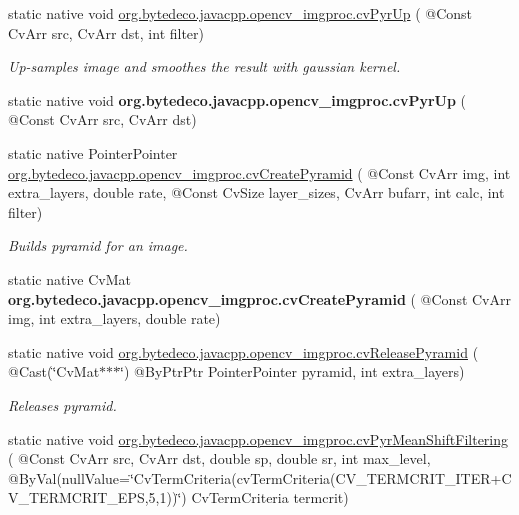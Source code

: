 \begin{DoxyCompactItemize}
\item 
static native void \hyperlink{group__imgproc__c_ga08b1a7b3bf0f0c133345b307e6dfa952}{org.\+bytedeco.\+javacpp.\+opencv\+\_\+imgproc.\+cv\+Pyr\+Up} ( @Const Cv\+Arr src, Cv\+Arr dst, int filter)
\begin{DoxyCompactList}\small\item\em Up-\/samples image and smoothes the result with gaussian kernel. \end{DoxyCompactList}\item 
\mbox{\label{group__imgproc__c_ga3121f9b420355a5fe0c4583d77e2f68d}} 
static native void {\bfseries org.\+bytedeco.\+javacpp.\+opencv\+\_\+imgproc.\+cv\+Pyr\+Up} ( @Const Cv\+Arr src, Cv\+Arr dst)
\item 
static native Pointer\+Pointer \hyperlink{group__imgproc__c_gad819c70ae44efaea82dfbf9745633179}{org.\+bytedeco.\+javacpp.\+opencv\+\_\+imgproc.\+cv\+Create\+Pyramid} ( @Const Cv\+Arr img, int extra\+\_\+layers, double rate, @Const Cv\+Size layer\+\_\+sizes, Cv\+Arr bufarr, int calc, int filter)
\begin{DoxyCompactList}\small\item\em Builds pyramid for an image. \end{DoxyCompactList}\item 
\mbox{\label{group__imgproc__c_gaa7de42cd41da20f87f5a3cf4fc0fc10a}} 
static native Cv\+Mat {\bfseries org.\+bytedeco.\+javacpp.\+opencv\+\_\+imgproc.\+cv\+Create\+Pyramid} ( @Const Cv\+Arr img, int extra\+\_\+layers, double rate)
\item 
\mbox{\label{group__imgproc__c_gafedcfec1793dc4d6dd6e5c97d4fb30a0}} 
static native void \hyperlink{group__imgproc__c_gafedcfec1793dc4d6dd6e5c97d4fb30a0}{org.\+bytedeco.\+javacpp.\+opencv\+\_\+imgproc.\+cv\+Release\+Pyramid} ( @Cast(\char`\"{}Cv\+Mat$\ast$$\ast$$\ast$\char`\"{}) @By\+Ptr\+Ptr Pointer\+Pointer pyramid, int extra\+\_\+layers)
\begin{DoxyCompactList}\small\item\em Releases pyramid. \end{DoxyCompactList}\item 
static native void \hyperlink{group__imgproc__c_ga03ca86df80599c20db2980fb4a3eeed2}{org.\+bytedeco.\+javacpp.\+opencv\+\_\+imgproc.\+cv\+Pyr\+Mean\+Shift\+Filtering} ( @Const Cv\+Arr src, Cv\+Arr dst, double sp, double sr, int max\+\_\+level, @By\+Val(null\+Value=\char`\"{}Cv\+Term\+Criteria(cv\+Term\+Criteria(C\+V\+\_\+\+T\+E\+R\+M\+C\+R\+I\+T\+\_\+\+I\+T\+ER+C\+V\+\_\+\+T\+E\+R\+M\+C\+R\+I\+T\+\_\+\+E\+PS,5,1))\char`\"{}) Cv\+Term\+Criteria termcrit)

\end{DoxyCompactItemize}
